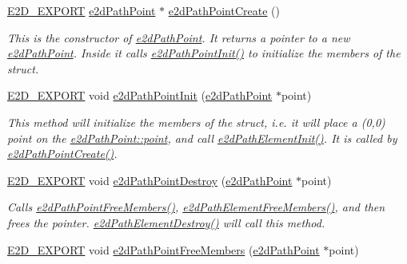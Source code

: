 \begin{DoxyCompactItemize}
\hyperlink{Ez2DS_8h_a9f14e9cb869e1a85fdaba03afcca0df9}{E2\-D\-\_\-\-E\-X\-P\-O\-R\-T} \hyperlink{structe2dPathPoint}{e2d\-Path\-Point} $\ast$ \hyperlink{group__e2dPath_ga06cfb3bcd4b491bf0904c10d3a798250}{e2d\-Path\-Point\-Create} ()
\begin{DoxyCompactList}\small\item\em This is the constructor of \hyperlink{structe2dPathPoint}{e2d\-Path\-Point}. It returns a pointer to a new \hyperlink{structe2dPathPoint}{e2d\-Path\-Point}. Inside it calls \hyperlink{group__e2dPath_gace705eabfb6e28ba6733f474a1330b65}{e2d\-Path\-Point\-Init()} to initialize the members of the struct. \end{DoxyCompactList}\item 
\hyperlink{Ez2DS_8h_a9f14e9cb869e1a85fdaba03afcca0df9}{E2\-D\-\_\-\-E\-X\-P\-O\-R\-T} void \hyperlink{group__e2dPath_gace705eabfb6e28ba6733f474a1330b65}{e2d\-Path\-Point\-Init} (\hyperlink{structe2dPathPoint}{e2d\-Path\-Point} $\ast$point)
\begin{DoxyCompactList}\small\item\em This method will initialize the members of the struct, i.\-e. it will place a (0,0) point on the \hyperlink{structe2dPathPoint_afff60c971a4d4728af80b4753d30c5bf}{e2d\-Path\-Point\-::point}, and call \hyperlink{group__e2dPath_gab17d15f04aabeec94a923839aaf5a49e}{e2d\-Path\-Element\-Init()}. It is called by \hyperlink{group__e2dPath_ga06cfb3bcd4b491bf0904c10d3a798250}{e2d\-Path\-Point\-Create()}. \end{DoxyCompactList}\item 
\hyperlink{Ez2DS_8h_a9f14e9cb869e1a85fdaba03afcca0df9}{E2\-D\-\_\-\-E\-X\-P\-O\-R\-T} void \hyperlink{group__e2dPath_ga62b1763b895dc904ccfdc690ea8eb602}{e2d\-Path\-Point\-Destroy} (\hyperlink{structe2dPathPoint}{e2d\-Path\-Point} $\ast$point)
\begin{DoxyCompactList}\small\item\em Calls \hyperlink{group__e2dPath_gaf05c3dc1682b4b801364273b8d99165f}{e2d\-Path\-Point\-Free\-Members()}, \hyperlink{group__e2dPath_gad2a7aabaa1ebd19138bd24ad5ec0a97e}{e2d\-Path\-Element\-Free\-Members()}, and then frees the pointer. \hyperlink{group__e2dPath_ga334ce1c6b0f6c3868ab2d546c0e67c14}{e2d\-Path\-Element\-Destroy()} will call this method. \end{DoxyCompactList}\item 
\hyperlink{Ez2DS_8h_a9f14e9cb869e1a85fdaba03afcca0df9}{E2\-D\-\_\-\-E\-X\-P\-O\-R\-T} void \hyperlink{group__e2dPath_gaf05c3dc1682b4b801364273b8d99165f}{e2d\-Path\-Point\-Free\-Members} (\hyperlink{structe2dPathPoint}{e2d\-Path\-Point} $\ast$point)

\end{DoxyCompactItemize}
